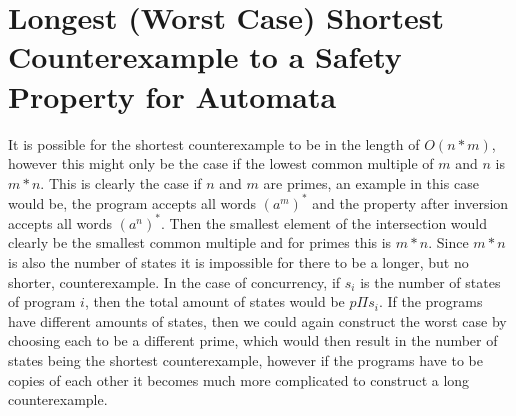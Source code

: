 \section{Longest (Worst Case) Shortest Counterexample to a Safety Property for Automata}
It is possible for the shortest counterexample to be in the length of $O(n*m)$, however this might only be the case if the lowest common multiple of $m$ and $n$ is $m*n$. This is clearly the case if $n$ and $m$ are primes, an example in this case would be, the program accepts all words $(a^m)^*$ and the property after inversion accepts all words $(a^n)^*$. Then the smallest element of the intersection would clearly be the smallest common multiple and for primes this is $m*n$. Since $m*n$ is also the number of states it is impossible for there to be a longer, but no shorter, counterexample. In the case of concurrency, if $s_i$ is the number of states of program $i$, then the total amount of states would be $p \Pi s_i$. If the programs have different amounts of states, then we could again construct the worst case by choosing each to be a different prime, which would then result in the number of states being the shortest counterexample, however if the programs have to be copies of each other it becomes much more complicated to construct a long counterexample.
